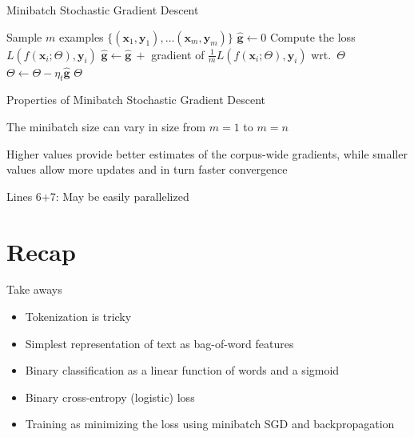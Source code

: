 \documentclass[12pt,aspectratio=169,handout]{beamer}
\begin{document}
\begin{frame}{Minibatch Stochastic Gradient Descent}
	
	\begin{algorithmic}[1]
		\State Sample $m$ examples $\{ (\bm{x}_1, \bm{y}_1), \ldots (\bm{x}_m, \bm{y}_m) \}$
		\State $\hat{\bm{g}} \gets 0$
			\State Compute the loss $L(f(\bm{x}_i; \Theta), \bm{y}_i)$
			\State $\hat{\bm{g}} \gets \hat{\bm{g}}\ + $ gradient of $\frac{1}{m} L(f(\bm{x}_i; \Theta), \bm{y}_i)$ wrt.\ $\Theta$
		\EndFor
		\State $\Theta \gets \Theta - \eta_t \hat{\bm{g}}$
		\EndWhile
		\State \Return $\Theta$
		\EndFunction
	\end{algorithmic}
	

\end{frame}

\begin{frame}{Properties of Minibatch Stochastic Gradient Descent}

The minibatch size can vary in size from $m = 1$ to $m = n$

Higher values provide better estimates of the corpus-wide gradients, while smaller values allow more updates and in turn faster convergence

Lines 6+7: May be easily parallelized

\end{frame}



\section*{Recap}

\begin{frame}{Take aways}
	
\begin{itemize}
	\item Tokenization is tricky	
	\item Simplest representation of text as bag-of-word features
	\item Binary classification as a linear function of words and a sigmoid
	\item Binary cross-entropy (logistic) loss
	\item Training as minimizing the loss using minibatch SGD and backpropagation
\end{itemize}
	
\end{frame}
\end{document}
